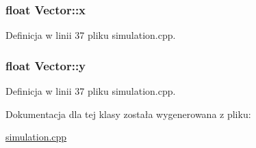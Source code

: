 \subsubsection[{x}]{\setlength{\rightskip}{0pt plus 5cm}float Vector\+::x\hspace{0.3cm}{\ttfamily [private]}}\label{class_vector_aca49165049a1e21ae47afcfc078819ed}


Definicja w linii 37 pliku simulation.\+cpp.

\hypertarget{class_vector_a81be9102fca6d9beea3efef522c4c09d}{}
\subsubsection[{y}]{\setlength{\rightskip}{0pt plus 5cm}float Vector\+::y\hspace{0.3cm}{\ttfamily [private]}}\label{class_vector_a81be9102fca6d9beea3efef522c4c09d}


Definicja w linii 37 pliku simulation.\+cpp.



Dokumentacja dla tej klasy została wygenerowana z pliku\+:\begin{DoxyCompactItemize}
\item 
\hyperlink{simulation_8cpp}{simulation.\+cpp}\end{DoxyCompactItemize}

